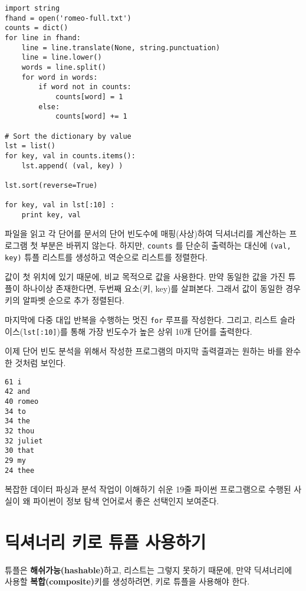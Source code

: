 \beforeverb
\begin{verbatim}
import string
fhand = open('romeo-full.txt')
counts = dict()
for line in fhand:
    line = line.translate(None, string.punctuation)
    line = line.lower()
    words = line.split()
    for word in words:
        if word not in counts:
            counts[word] = 1
        else:
            counts[word] += 1

# Sort the dictionary by value
lst = list()
for key, val in counts.items():
    lst.append( (val, key) )

lst.sort(reverse=True)

for key, val in lst[:10] :
    print key, val
\end{verbatim}
\afterverb
%

파일을 읽고 각 단어를 문서의 단어 빈도수에 매핑(사상)하여 딕셔너리를 계산하는 프로그램 첫 부분은 바뀌지 않는다.
하지만, {\tt counts} 를 단순히 출력하는 대신에 {\tt (val, key)} 튜플 리스트를 생성하고 역순으로 리스트를 정렬한다.

값이 첫 위치에 있기 때문에, 비교 목적으로 값을 사용한다. 
만약 동일한 값을 가진 튜플이 하나이상 존재한다면, 두번째 요소(키, key)를 살펴본다.
그래서 값이 동일한 경우 키의 알파벳 순으로 추가 정렬된다.

마지막에 다중 대입 반복을 수행하는 멋진 {\tt for} 루프를 작성한다. 
그리고, 리스트 슬라이스({\tt lst[:10]})를 통해 가장 빈도수가 높은 상위 10개 단어를 출력한다.

이제 단어 빈도 분석을 위해서 작성한 프로그램의 마지막 출력결과는 원하는 바를 완수한 것처럼 보인다.

\beforeverb
\begin{verbatim}
61 i
42 and
40 romeo
34 to
34 the
32 thou
32 juliet
30 that
29 my
24 thee
\end{verbatim}
\afterverb
%

복잡한 데이터 파싱과 분석 작업이 이해하기 쉬운 19줄 파이썬 프로그램으로 수행된 사실이 왜 파이썬이 정보 탐색 언어로서 좋은 선택인지 보여준다.

\section{ 딕셔너리 키로 튜플 사용하기}


튜플은 {\bf 해쉬가능(hashable)}하고, 리스트는 그렇지 못하기 때문에, 만약 딕셔너리에 사용할 {\bf 복합(composite)}키를 생성하려면, 
키로 튜플을 사용해야 한다.

